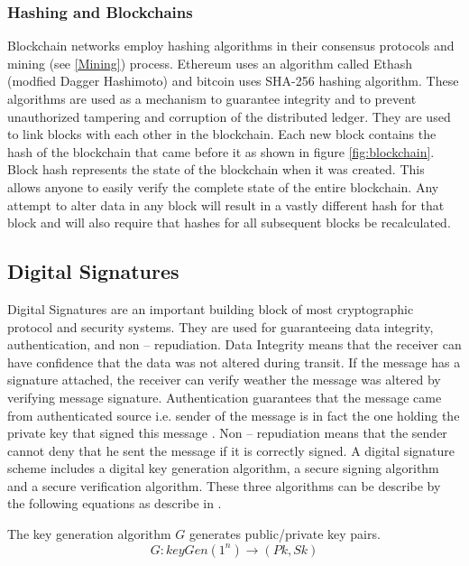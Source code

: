 \subsubsection{Hashing and Blockchains}
Blockchain networks employ hashing algorithms in their consensus protocols and mining (see \ref{Mining}) process. Ethereum uses an algorithm called Ethash (modfied Dagger Hashimoto) and bitcoin uses SHA-256 \cite{dang_2015} hashing algorithm. These algorithms are used as a mechanism to guarantee integrity and to prevent unauthorized tampering and corruption of the distributed ledger. They are used to link blocks with each other in the blockchain. Each new block contains the hash of the blockchain that came before it as shown in figure \ref{fig:blockchain}. Block hash represents the state of the blockchain when it was created. This allows anyone to easily verify the complete state of the entire blockchain. Any attempt to alter data in any block will result in a vastly different hash for that block and will also require that hashes for all subsequent blocks be recalculated.
\clearpage
\subsection{Digital Signatures} \label{DSD} 
Digital Signatures are an important building block of most cryptographic protocol and security systems. They are used for guaranteeing data integrity, authentication, and non – repudiation. Data Integrity means that the receiver can have confidence that the data was not altered during transit. If the message has a signature attached, the receiver can verify weather the message was altered by verifying message signature. Authentication guarantees that the message came from authenticated source i.e. sender of the message is in fact the one holding the private key that signed this message \cite{Rivest:1978:MOD:359340.359342}. Non – repudiation means that the sender cannot deny that he sent the message if it is correctly signed. A digital signature scheme includes a digital key generation algorithm, a secure signing algorithm and a secure verification algorithm. These three algorithms can be describe by the following equations as describe in \cite{Lysyanskaya:2002:SSA:936405}. 

The key generation algorithm $G$ generates public/private key pairs.
\begin{equation}
G:keyGen(1^n) \rightarrow (Pk,Sk) 
\end{equation}


